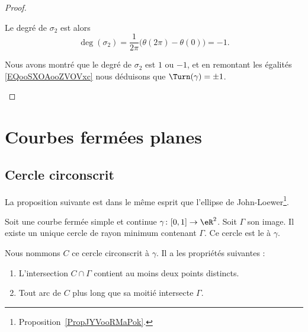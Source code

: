 \begin{proof}
\begin{subproof}
\begin{subproof}
			Le degré de \( \sigma_2\) est alors
			\begin{equation}
				\deg(\sigma_2)=\frac{1}{ 2\pi }\big( \theta(2\pi)-\theta(0) \big)=-1.
			\end{equation}

		\end{subproof}

		\spitem[Conclusion]

		Nous avons montré que le degré de \( \sigma_2\) est \( 1\) ou \( -1\), et en remontant les égalités \eqref{EQooSXOAooZVOVxc} nous déduisons que \( \Turn(\gamma)=\pm 1\).

	\end{subproof}
\end{proof}

\section{Courbes fermées planes}

\subsection{Cercle circonscrit}

La proposition suivante est dans le même esprit que l'ellipse de John-Loewer\footnote{Proposition~\ref{PropJYVooRMaPok}.}.
\begin{propositionDef}      \label{PROPDEFooCWESooVbDven}
	Soit une courbe fermée simple et continue \( \gamma\colon \mathopen[ 0 , 1 \mathclose]\to \eR^2\). Soit \( \Gamma\) son image. Il existe un unique cercle de rayon minimum contenant \( \Gamma\). Ce cercle est le  à \( \gamma\).

	Nous nommons \( C\) ce cercle circonscrit à \( \gamma\). Il a les propriétés suivantes :
	\begin{enumerate}
		\item
		      L'intersection \( C\cap \Gamma\) contient au moins deux points distincts.
		\item
		      Tout arc de \( C\) plus long que sa moitié intersecte \( \Gamma\).
	\end{enumerate}
\end{propositionDef}

